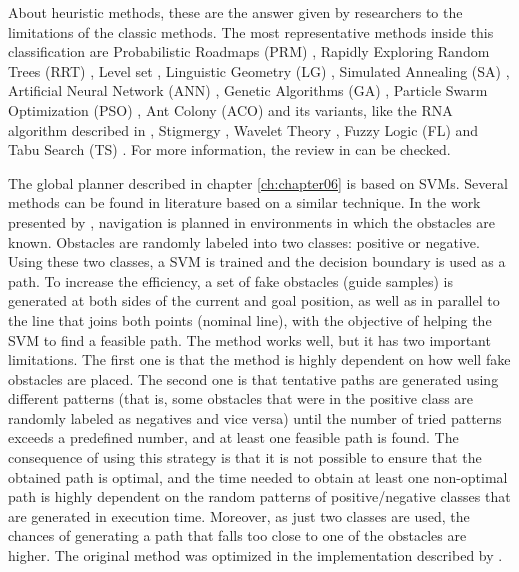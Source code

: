 About heuristic methods, these are the answer given by researchers to the limitations of the classic methods. The most representative methods inside this classification are Probabilistic Roadmaps (PRM) \citep{kavraki1996probabilistic}, Rapidly Exploring Random Trees (RRT) \citep{lavalle2000rapidly}, Level set \citep{sethian1999level}, Linguistic Geometry (LG) \citep{stilman1993network}, Simulated Annealing (SA) \citep{zhu2006robot}, Artificial Neural Network (ANN) \citep{hossain2012real}, Genetic Algorithms (GA) \citep{zhang2007evolutionary}, Particle Swarm Optimization (PSO) \citep{chen2006smooth}, Ant Colony (ACO) \citep{mou2008modified} and its variants, like the RNA algorithm described in \cite{zhu2011new}, Stigmergy \citep{cazangi2006evolutionary}, Wavelet Theory \citep{doh2005systematic}, Fuzzy Logic (FL) \citep{kladis2011energy} and Tabu Search (TS) \citep{nguyen2012multi}. For more information, the review in \cite{masehian2007classic} can be checked.

The global planner described in chapter \ref{ch:chapter06} is based on \acp{SVM}. Several methods can be found in literature based on a similar technique. In the work presented by \cite{miura2006support}, navigation is planned in environments in which the obstacles are known. Obstacles are randomly labeled into two classes: positive or negative. Using these two classes, a \ac{SVM} is trained and the decision boundary is used as a path. To increase the efficiency, a set of fake obstacles (guide samples) is generated at both sides of the current and goal position, as well as in parallel to the line that joins both points (nominal line), with the objective of helping the \ac{SVM} to find a feasible path. The method works well, but it has two important limitations. The first one is that the method is highly dependent on how well fake obstacles are placed. The second one is that tentative paths are generated using different patterns (that is, some obstacles that were in the positive class are randomly labeled as negatives and vice versa) until the number of tried patterns exceeds a predefined number, and at least one feasible path is found. The consequence of using this strategy is that it is not possible to ensure that the obtained path is optimal, and the time needed to obtain at least one non-optimal path is highly dependent on the random patterns of positive/negative classes that are generated in execution time. Moreover, as just two classes are used, the chances of generating a path that falls too close to one of the obstacles are higher. The original method was optimized in the implementation described by \cite{xia2013semi}.

